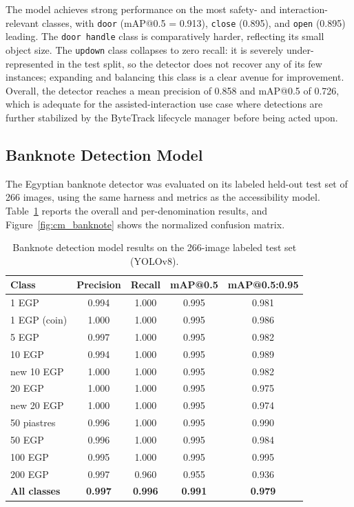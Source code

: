 The model achieves strong performance on the most safety- and interaction-relevant classes, with \texttt{door} (mAP@0.5 = 0.913), \texttt{close} (0.895), and \texttt{open} (0.895) leading. The \texttt{door handle} class is comparatively harder, reflecting its small object size. The \texttt{updown} class collapses to zero recall: it is severely under-represented in the test split, so the detector does not recover any of its few instances; expanding and balancing this class is a clear avenue for improvement. Overall, the detector reaches a mean precision of 0.858 and mAP@0.5 of 0.726, which is adequate for the assisted-interaction use case where detections are further stabilized by the ByteTrack lifecycle manager before being acted upon.

\subsection{Banknote Detection Model}

The Egyptian banknote detector was evaluated on its labeled held-out test set of 266 images, using the same harness and metrics as the accessibility model. Table~\ref{tab:banknote_results} reports the overall and per-denomination results, and Figure~\ref{fig:cm_banknote} shows the normalized confusion matrix.

\begin{table}[H]
\centering
\begin{tabular}{|l|c|c|c|c|}
\hline
\textbf{Class} & \textbf{Precision} & \textbf{Recall} & \textbf{mAP@0.5} & \textbf{mAP@0.5:0.95} \\
\hline
1 EGP & 0.994 & 1.000 & 0.995 & 0.981 \\
\hline
1 EGP (coin) & 1.000 & 1.000 & 0.995 & 0.986 \\
\hline
5 EGP & 0.997 & 1.000 & 0.995 & 0.982 \\
\hline
10 EGP & 0.994 & 1.000 & 0.995 & 0.989 \\
\hline
new 10 EGP & 1.000 & 1.000 & 0.995 & 0.982 \\
\hline
20 EGP & 1.000 & 1.000 & 0.995 & 0.975 \\
\hline
new 20 EGP & 1.000 & 1.000 & 0.995 & 0.974 \\
\hline
50 piastres & 0.996 & 1.000 & 0.995 & 0.990 \\
\hline
50 EGP & 0.996 & 1.000 & 0.995 & 0.984 \\
\hline
100 EGP & 0.995 & 1.000 & 0.995 & 0.995 \\
\hline
200 EGP & 0.997 & 0.960 & 0.955 & 0.936 \\
\hline
\textbf{All classes} & \textbf{0.997} & \textbf{0.996} & \textbf{0.991} & \textbf{0.979} \\
\hline
\end{tabular}
\caption{Banknote detection model results on the 266-image labeled test set (YOLOv8).}
\label{tab:banknote_results}
\end{table}

